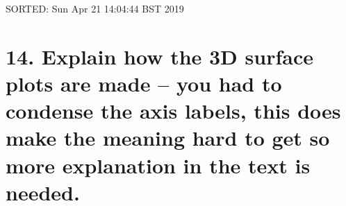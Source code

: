 \documentclass[12pt]{article}
\begin{document}
SORTED:   Sun Apr 21 14:04:44 BST 2019


\section*{14.
Explain how the 3D surface plots are made --
you had to condense the axis labels, this 
does make the meaning hard to get 
so more explanation in the text is needed.
}


%
%
%
\end{document}
